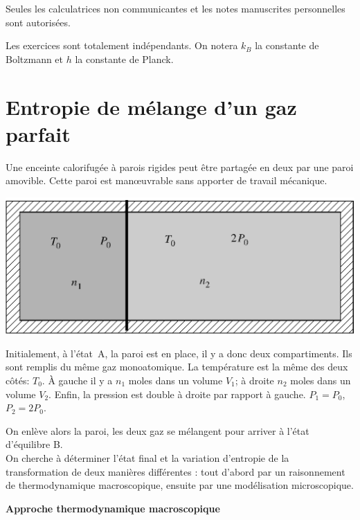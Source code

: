 \documentclass[utf8, 11pt]{feuille}
\begin{document}
Seules les calculatrices non communicantes et les notes manuscrites personnelles sont autorisées.

Les exercices sont totalement indépendants. On notera $k_B$ la constante de Boltzmann et $h$ la constante de Planck.


\section{Entropie de mélange d'un gaz parfait}


Une enceinte calorifugée à parois rigides peut être partagée en deux par une paroi amovible. Cette paroi est man\oe uvrable sans apporter de travail mécanique.

\begin{center}
\includegraphics[scale=0.8]{detente_isolee_sur_reseau}
\end{center}

Initialement, à l'état~A, la paroi est en place, il y a donc deux
compartiments.
Ils sont
remplis du même gaz monoatomique. La température est la même des deux
côtés: $T_0$. À gauche il y a $n_1$ moles dans un volume $V_1$; à
droite $n_2$ moles dans un volume $V_2$. Enfin, la pression est double
à droite par rapport à gauche. $P_1 = P_0$, $P_2 = 2P_0$.

On enlève alors la paroi, les deux gaz se mélangent pour arriver à l'état d'équilibre B.\\
On cherche à déterminer l'état final et la variation d'entropie de la
transformation de deux manières différentes : tout d'abord par un
raisonnement de thermodynamique macroscopique, ensuite par une
modélisation microscopique.

\medskip

{\sffamily\bfseries{Approche thermodynamique macroscopique}}
\end{document}
